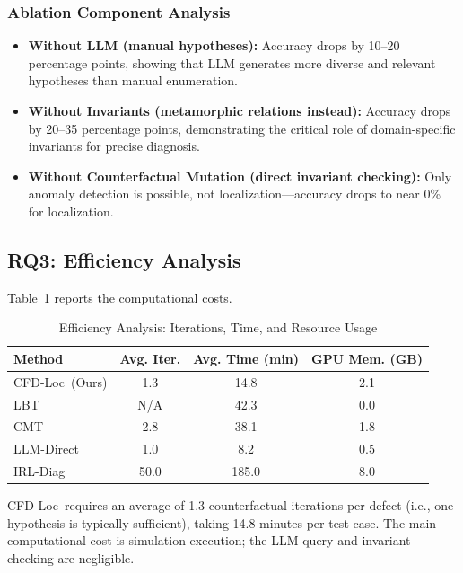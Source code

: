 \documentclass[conference]{IEEEtran}
\theoremstyle{plain}
\newcommand{\methodname}{CFD-Loc}
\begin{document}
\subsubsection{Ablation Component Analysis}

\begin{itemize}[nosep]
    \item \textbf{Without LLM (manual hypotheses):} Accuracy drops by 10--20 percentage points, showing that LLM generates more diverse and relevant hypotheses than manual enumeration.
    \item \textbf{Without Invariants (metamorphic relations instead):} Accuracy drops by 20--35 percentage points, demonstrating the critical role of domain-specific invariants for precise diagnosis.
    \item \textbf{Without Counterfactual Mutation (direct invariant checking):} Only anomaly detection is possible, not localization---accuracy drops to near 0\% for localization.
\end{itemize}

\subsection{RQ3: Efficiency Analysis}

Table~\ref{tab:efficiency} reports the computational costs.

\begin{table}[h]
\centering
\caption{Efficiency Analysis: Iterations, Time, and Resource Usage}
\label{tab:efficiency}
\begin{tabular}{lccc}
\toprule
\textbf{Method} & \textbf{Avg. Iter.} & \textbf{Avg. Time (min)} & \textbf{GPU Mem. (GB)} \\
\midrule
\methodname\ (Ours) & 1.3 & 14.8 & 2.1 \\
LBT & N/A & 42.3 & 0.0 \\
CMT & 2.8 & 38.1 & 1.8 \\
LLM-Direct & 1.0 & 8.2 & 0.5 \\
IRL-Diag & 50.0 & 185.0 & 8.0 \\
\bottomrule
\end{tabular}
\end{table}

\methodname\ requires an average of 1.3 counterfactual iterations per defect (i.e., one hypothesis is typically sufficient), taking 14.8 minutes per test case. The main computational cost is simulation execution; the LLM query and invariant checking are negligible.
\end{document}
